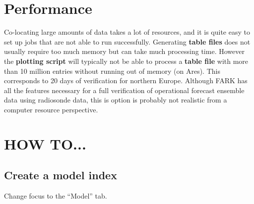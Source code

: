 \documentclass[letterpaper,10pt,twoside,twocolumn,openany]{book}
\begin{document}

\section{Performance}

Co-locating large amounts of data takes a lot of resources, and it is quite easy to
set up jobs that are not able to run successfully. Generating {\bf table files}
does not usually require too much memory but can take much processing time.
However the {\bf plotting script} will typically not be able to process a {\bf table file} with 
more than 10 million entries without running out of memory (on Ares). 
This corresponds to 20 days of verification for northern Europe.
Although FARK has all the features necessary for a full verification of
operational forecast ensemble data using radiosonde data, this is option is
probably not realistic from a computer resource perspective.

\section{HOW TO...}

\subsection{Create a model index}
Change focus to the ``Model'' tab.
\end{document}
